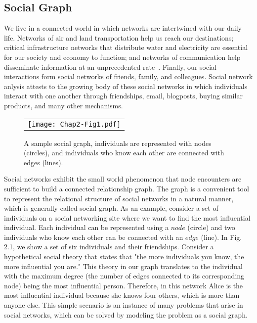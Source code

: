 \subsection{Social Graph}\label{Chap2_01_01}
We live in a connected world in which networks are intertwined with our daily life. Networks of air and land transportation help us reach our destinations; critical infrastructure networks that distribute water and electricity are essential for our society and economy to function; and networks of communication help disseminate information at an unprecedented rate~\cite{RZafarani2014}. Finally, our social interactions form social networks of friends, family, and colleagues. Social network anlysis attests to the growing body of these social networks in which individuals interact with one another through friendships, email, blogposts, buying similar products, and many other mechanisms.
\begin{figure}[t]
\begin{center}
  \begin{tabular}{c}
  \texttt{[image: Chap2-Fig1.pdf]}
  \end{tabular}
  \caption{A sample social graph, individuals are represented with nodes (circles), and individuals who know each other are connected with edges (lines).}
\end{center}
\end{figure}

Social networks exhibit the small world phenomenon that node encounters are sufficient to build a connected relationship graph. The graph is a convenient tool to represent the relational structure of social networks in a natural manner, which is generally called social graph. As an example, consider a set of individuals on a social networking site where we want to find the most influential individual. Each individual can be represented using a $node$ (circle) and two individuals who know each other can be connected with an $edge$ (line). In Fig. 2.1, we show a set of six individuals and their friendships. Consider a hypothetical social theory that states that "the more individuals you know, the more influential you are." This theory in our graph translates to the individual with the maximum degree (the number of edges connected to its corresponding node) being the most influential person. Therefore, in this network Alice is the most influential individual because she knows four others, which is more than anyone else. This simple scenario is an instance of many problems that arise in social networks, which can be solved by modeling the problem as a social graph.

